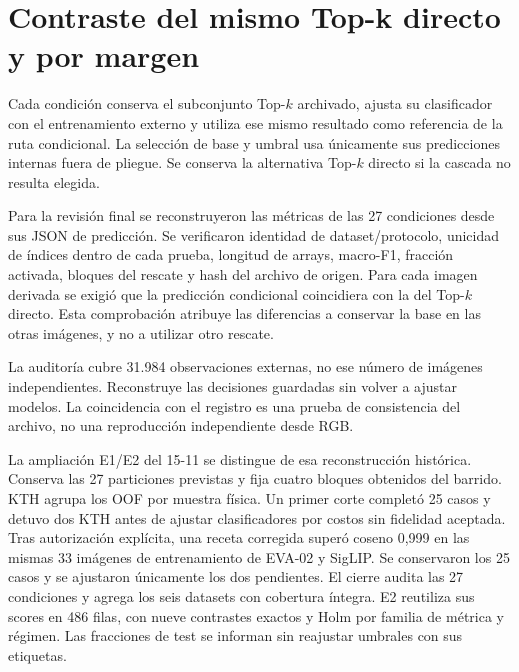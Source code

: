 \section{Contraste del mismo Top-k directo y por margen}
Cada condición conserva el subconjunto Top-\(k\) archivado, ajusta su clasificador con el entrenamiento externo y utiliza ese mismo resultado como referencia de la ruta condicional. La selección de base y umbral usa únicamente sus predicciones internas fuera de pliegue. Se conserva la alternativa Top-\(k\) directo si la cascada no resulta elegida.

Para la revisión final se reconstruyeron las métricas de las 27 condiciones desde sus JSON de predicción. Se verificaron identidad de dataset/protocolo, unicidad de índices dentro de cada prueba, longitud de arrays, macro-F1, fracción activada, bloques del rescate y hash del archivo de origen. Para cada imagen derivada se exigió que la predicción condicional coincidiera con la del Top-\(k\) directo. Esta comprobación atribuye las diferencias a conservar la base en las otras imágenes, y no a utilizar otro rescate.

La auditoría cubre 31.984 observaciones externas, no ese número de imágenes independientes. Reconstruye las decisiones guardadas sin volver a ajustar modelos. La coincidencia con el registro es una prueba de consistencia del archivo, no una reproducción independiente desde RGB.

La ampliación E1/E2 del 15-11 se distingue de esa reconstrucción histórica. Conserva las 27 particiones previstas y fija cuatro bloques obtenidos del barrido. KTH agrupa los OOF por muestra física. Un primer corte completó 25 casos y detuvo dos KTH antes de ajustar clasificadores por costos sin fidelidad aceptada. Tras autorización explícita, una receta corregida superó coseno 0,999 en las mismas 33 imágenes de entrenamiento de EVA-02 y SigLIP. Se conservaron los 25 casos y se ajustaron únicamente los dos pendientes. El cierre audita las 27 condiciones y agrega los seis datasets con cobertura íntegra. E2 reutiliza sus scores en 486 filas, con nueve contrastes exactos y Holm por familia de métrica y régimen. Las fracciones de test se informan sin reajustar umbrales con sus etiquetas.

